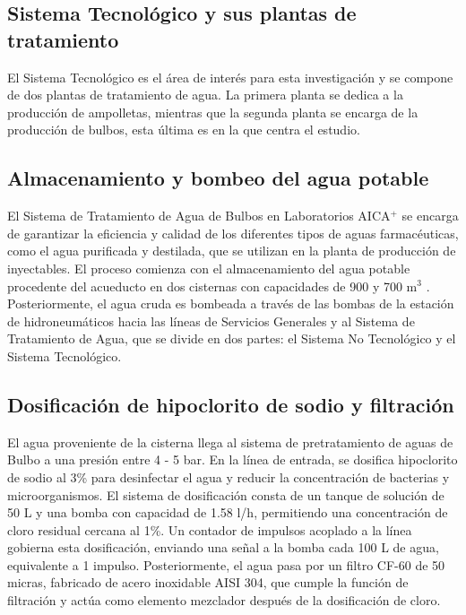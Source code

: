 
\subsection*{Sistema Tecnológico y sus plantas de tratamiento}

El Sistema Tecnológico es el área de interés para esta investigación y se compone de dos plantas de tratamiento de agua.
La primera planta se dedica a la producción de ampolletas, mientras que la segunda planta se encarga de la producción de bulbos, esta última es en la que centra el estudio.



\subsection*{Almacenamiento y bombeo del agua potable}

El Sistema de Tratamiento de Agua de Bulbos en Laboratorios AICA$^+$ se encarga de garantizar la eficiencia y calidad de los
diferentes tipos de aguas farmacéuticas, como el agua purificada y destilada, que se utilizan en la planta de producción de inyectables.
El proceso comienza con el almacenamiento del agua potable procedente del acueducto en dos cisternas con capacidades de 900 y 700 m$^3$ .
Posteriormente, el agua cruda es bombeada a través de las bombas de la estación de hidroneumáticos hacia las líneas de Servicios Generales y
al Sistema de Tratamiento de Agua, que se divide en dos partes: el Sistema No Tecnológico y el Sistema Tecnológico.


\subsection*{Dosificación de hipoclorito de sodio y filtración}

El agua proveniente de la cisterna llega al sistema de pretratamiento de aguas de Bulbo a una presión entre 4 - 5 bar. En la línea de entrada, se
dosifica hipoclorito de sodio al 3\% para desinfectar el agua y reducir la concentración de bacterias y microorganismos. El sistema de dosificación consta de un
tanque de solución de 50 L y una bomba con capacidad de 1.58 l/h, permitiendo una concentración de cloro residual cercana al 1\%.
Un contador de impulsos acoplado a la línea gobierna esta dosificación, enviando una señal a la bomba cada 100 L de agua, equivalente a 1
impulso. Posteriormente, el agua pasa por un filtro CF-60 de 50 micras, fabricado de acero inoxidable AISI 304, que cumple la función de
filtración y actúa como elemento mezclador después de la dosificación de cloro.

